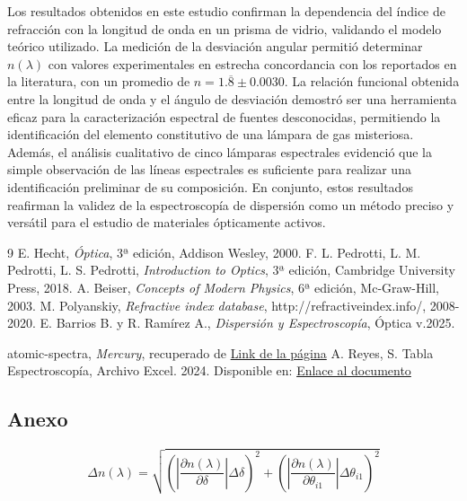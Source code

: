 \documentclass[article,12pt]{elsarticle}
\begin{document}
Los resultados obtenidos en este estudio confirman la dependencia del índice de refracción con la longitud de onda en un prisma de vidrio, validando el modelo teórico utilizado. La medición de la desviación angular permitió determinar \( n(\lambda) \) con valores experimentales en estrecha concordancia con los reportados en la literatura, con un promedio de \( n = 1.\overline{8} \pm 0.0030\). La relación funcional obtenida entre la longitud de onda y el ángulo de desviación demostró ser una herramienta eficaz para la caracterización espectral de fuentes desconocidas, permitiendo la identificación del elemento constitutivo de una lámpara de gas misteriosa. Además, el análisis cualitativo de cinco lámparas espectrales evidenció que la simple observación de las líneas espectrales es suficiente para realizar una identificación preliminar de su composición. En conjunto, estos resultados reafirman la validez de la espectroscopía de dispersión como un método preciso y versátil para el estudio de materiales ópticamente activos.



\begin{thebibliography}{9}
 E. Hecht, \textit{Óptica}, 3ª edición, Addison Wesley, 2000.
     F. L. Pedrotti, L. M. Pedrotti, L. S. Pedrotti, \textit{Introduction to Optics}, 3ª edición, Cambridge University Press, 2018.
     A. Beiser, \textit{Concepts of Modern Physics}, 6ª edición, Mc-Graw-Hill, 2003.
     M. Polyanskiy, \textit{Refractive index database}, http://refractiveindex.info/, 2008-2020.
     E. Barrios B. y R. Ramírez A., \textit{Dispersión y Espectroscopía}, Óptica v.2025.

    atomic-spectra, \textit{Mercury}, recuperado de \href{https://www.atomic-spectra.net/spectrum.php?elem=Hg}{Link de la página}
        A. Reyes, S. Tabla Espectroscopía, Archivo Excel. 2024. Disponible en: \href{https://docs.google.com/spreadsheets/d/1C7Nac7PhHVjDRlbUn4gvEQz00NnCPn-N/edit?usp=sharing&ouid=112625838925660900694&rtpof=true&sd=true}{Enlace al documento}
\end{thebibliography}


\subsection*{Anexo}

\begin{mdframed}
\begin{equation}
    \Delta n(\lambda)= \sqrt{\left(\left|\frac{\partial n(\lambda)}{\partial \delta}\right|\Delta\delta\right)^2+\left(\left|\frac{\partial n(\lambda)}{\partial \theta_{i1}}\right|\Delta\theta_{i1}\right)^2}
\end{equation}
\end{mdframed}
\end{document}
